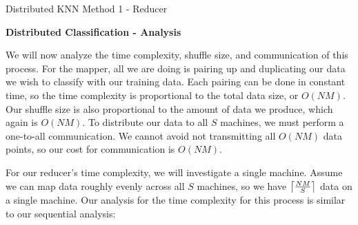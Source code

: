 \begin{algorithm}
\DontPrintSemicolon
{}
\caption{Distributed KNN Method 1 - Reducer\label{KNN1r}}
\end{algorithm}

\vspace{5 mm}
\noindent
\textbf{Distributed Classification - Analysis}

\vspace{5 mm}
\noindent
We will now analyze the time complexity, shuffle size, and communication of
this process. For the mapper, all we are doing is pairing up and duplicating our
data we wish to classify with our training data. Each pairing can be done in
constant time, so the time complexity is proportional to the total data size,
or $O(N M)$. Our shuffle size is also proportional to the amount of data we
produce, which again is $O(N M)$. To distribute our data to all $S$ machines, 
we must perform a one-to-all communication. We cannot avoid not transmitting 
all $O(N M)$ data points, so our cost for communication is $O(N M)$.

\vspace{5 mm}
\noindent
For our reducer's time complexity, we will investigate a single machine. Assume 
we can map data roughly evenly across all $S$ machines, so we have 
$\ceil*{\frac{N M}{S}}$ data on a single machine. Our analysis for the time 
complexity for this process is similar to our sequential analysis:

